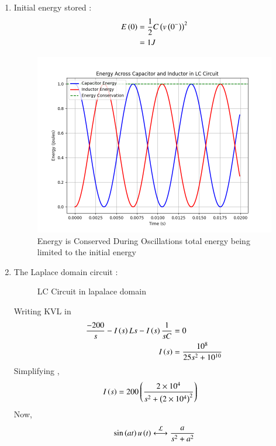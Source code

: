 \documentclass[journal,12pt,twocolumn]{IEEEtran}
\theoremstyle{remark}
\begin{document}
\begin{enumerate}[label=\textbf{(\alph*)}]
    \item Initial energy stored :
    \begin{align}
        E\left(0\right)&= \frac{1}{2}C\left(v\left(0^-\right)\right)^2\\
            &=  1 J 
    \end{align}
\begin{figure}[H]
    \includegraphics[width=1\columnwidth]{figs/Plot_energy.png}
    \caption{Energy is Conserved During Oscillations total energy being limited to the initial energy}
    \label{fig:energy_plots}
\end{figure}
 \item 
The Laplace domain circuit :
\begin{figure}[H]
    \centering
    \resizebox{0.4\textwidth}{!}{}
    \caption{LC Circuit in lapalace domain}
    \label{fig:ncert_12.7.12_cktdiag_lap}
\end{figure}
Writing KVL in 
\begin{align}
    \frac{-200}{s} - I\left(s\right)Ls -I\left(s\right)\frac{1}{sC} &= 0\\
    I\left(s\right) &= \frac{10^8}{25s^2 + 10^{10}}\label{eq:ncert12.7.12_i(s)}
\end{align}
Simplifying ,
\begin{align}
    I\left(s\right) &= 200\left(\frac{2\times10^4}{s^2+\left(2\times10^4\right)^2}\right)
\end{align}
Now,
\begin{align}
    \sin\brak{at}u\brak{t} &\system{L} \frac{a}{s^2+a^2} \label{eq:gate_22_sint_result}\\

\end{align}
\end{enumerate}
\end{document}
